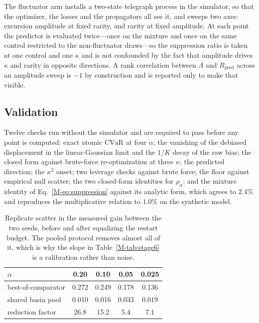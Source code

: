\documentclass[aps,pra,onecolumn,notitlepage,superscriptaddress,nofootinbib,floatfix]{revtex4-2}
\newcommand{\cvar}{\mathrm{CVaR}}
\begin{document}
The fluctuator arm installs a two-state telegraph process in the simulator,
so that the optimizer, the losses and the propagators all see it, and sweeps
two axes: excursion amplitude at fixed rarity, and rarity at fixed amplitude.
At each point the predictor is evaluated twice---once on the mixture and once
on the same control restricted to the non-fluctuator draws---so the
suppression ratio is taken at one control and one $\kappa$ and is not
confounded by the fact that amplitude drives $\kappa$ and rarity in opposite
directions. A rank correlation between $\Lambda$ and $R_{\mathrm{pred}}$
across an amplitude sweep is $-1$ by construction and is reported only to
make that visible.

\subsection{Validation}

Twelve checks run without the simulator and are required to pass before any
point is computed: exact atomic $\cvar$ at four $\alpha$; the vanishing of
the debiased displacement in the linear-Gaussian limit and the $1/K$ decay of
the raw bias; the closed form against brute-force re-optimization at three
$\kappa$; the predicted direction; the $\kappa^2$ onset; two leverage checks
against brute force; the floor against empirical null scatter; the two
closed-form identities for $\rho_\alpha$; and the mixture identity of
Eq.~\eqref{M-eq:suppression} against its analytic form, which agrees to $2.4\%$
and reproduces the multiplicative relation to $1.0\%$ on the synthetic model.

\begin{table}[t]
\caption{Replicate scatter in the measured gain between the two seeds, before
and after equalizing the restart budget. The pooled protocol removes almost
all of it, which is why the slope in Table~\ref{M-tab:stage6} is a calibration
rather than noise.}
\label{tab:s13pool}
\begin{ruledtabular}
\begin{tabular}{lcccc}
$\alpha$ & 0.20 & 0.10 & 0.05 & 0.025 \\ \hline
best-of-comparator & 0.272 & 0.249 & 0.178 & 0.136 \\
shared basin pool  & 0.010 & 0.016 & 0.033 & 0.019 \\
reduction factor   & 26.8  & 15.2  & 5.4   & 7.1   \\
\end{tabular}
\end{ruledtabular}
\end{table}
\end{document}
